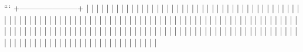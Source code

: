 ```
  +---------------------+
  |                      |
  |                      |
  |                      |
  |                      |
  |                      |
  |                      |
  |                      |
  |                      |
  |                      |
  |                      |
  |                      |
  |                      |
  |                      |
  |                      |
  |                      |
  |                      |
  |                      |
  |                      |
  |                      |
  |                      |
  |                      |
  |                      |
  |                      |
  |                      |
  |                      |
  |                      |
  |                      |
  |                      |
  |                      |
  |                      |
  |                      |
  |                      |
  |                      |
  |                      |
  |                      |
  |                      |
  |                      |
  |                      |
  |                      |
  |                      |
  |                      |
  |                      |
  |                      |
  |                      |
  |                      |
  |                      |
  |                      |
  |                      |
  |                      |
  |                      |
  |                      |
  |                      |
  |                      |
  |                      |
  |                      |
  |                      |
  |                      |
  |                      |
  |                      |
  |                      |
  |                      |
  |                      |
  |                      |
  |                      |
  |                      |
  |                      |
  |                      |
  |                      |
  |                      |
  |                      |
  |                      |
  |                      |
  |                      |
  |                      |
  |                      |
  |                      |
  |                      |
  |                      |
  |                      |
  |                      |
  |                      |
  |                      |
  |                      |
  |                      |
  |                      |
  |                      |
  |                      |
  |                      |
  |                      |
  |                      |
  |                      |
  |                      |
  |                      |
  |                      |
  |                      |
  |                      |
